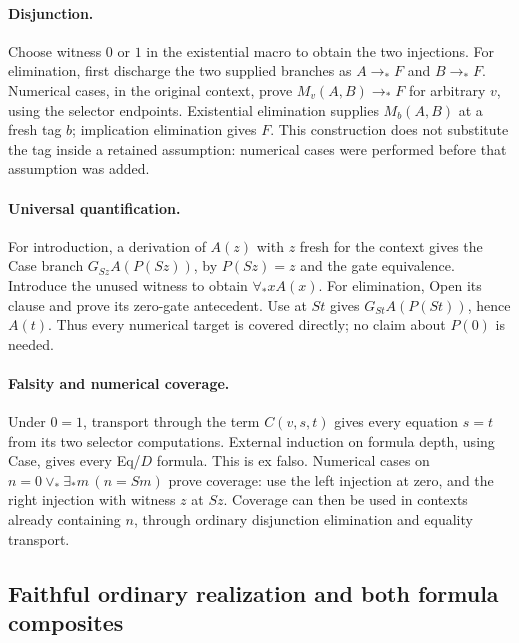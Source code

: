 \documentclass[10pt,letterpaper]{article}
\theoremstyle{definition}
\theoremstyle{remark}
\begin{document}
\paragraph{Disjunction.}
Choose witness $0$ or $1$ in the existential macro to obtain the two
injections. For elimination, first discharge the two supplied branches
as $A\to_*F$ and $B\to_*F$. Numerical cases, in the original context,
prove $M_v(A,B)\to_*F$ for arbitrary $v$, using the selector endpoints.
Existential elimination supplies $M_b(A,B)$ at a fresh tag $b$;
implication elimination gives $F$. This construction does not substitute
the tag inside a retained assumption: numerical cases were performed
before that assumption was added.

\paragraph{Universal quantification.}
For introduction, a derivation of $A(z)$ with $z$ fresh for the context
gives the Case branch $G_{Sz}A(P(Sz))$, by $P(Sz)=z$ and the gate
equivalence. Introduce the unused witness to obtain $\forall_*xA(x)$.
For elimination, Open its clause and prove its zero-gate antecedent.
Use at $St$ gives $G_{St}A(P(St))$, hence $A(t)$. Thus every numerical
target is covered directly; no claim about $P(0)$ is needed.

\paragraph{Falsity and numerical coverage.}
Under $0=1$, transport through the term $C(v,s,t)$ gives every equation
$s=t$ from its two selector computations. External induction on formula
depth, using Case, gives every Eq/$D$ formula. This is ex falso.
Numerical cases on
$n=0\lor_*\exists_*m\,(n=Sm)$ prove coverage: use the left injection
at zero, and the right injection with witness $z$ at $Sz$.
Coverage can then be used in contexts already containing $n$, through
ordinary disjunction elimination and equality transport.

\subsection{Faithful ordinary realization and both formula composites}
\end{document}

